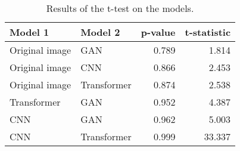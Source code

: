 \begin{table}
\centering
\caption{Results of the t-test on the models.}
\label{tab:ttest}
\begin{tabular}{llrr}
\toprule
       Model 1 &     Model 2 &  p-value &  t-statistic \\
\midrule
Original image &         GAN &    0.789 &        1.814 \\
Original image &         CNN &    0.866 &        2.453 \\
Original image & Transformer &    0.874 &        2.538 \\
   Transformer &         GAN &    0.952 &        4.387 \\
           CNN &         GAN &    0.962 &        5.003 \\
           CNN & Transformer &    0.999 &       33.337 \\
\bottomrule
\end{tabular}
\end{table}
